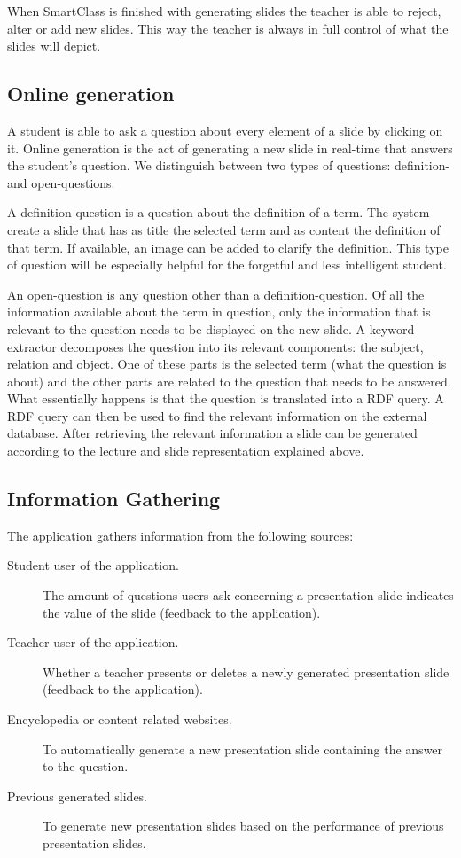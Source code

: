 \documentclass[11pt]{article}
\begin{document}
When SmartClass is finished with generating slides the teacher is able to reject, alter or add new slides. This way the teacher is always in full control of what the slides will depict. 

\subsection{Online generation}
A student is able to ask a question about every element of a slide by clicking on it. Online generation is the act of generating a new slide in real-time that answers the student’s question. We distinguish between two types of questions: definition- and open-questions. 

A definition-question is a question about the definition of a term. The system create a slide that has as title the selected term and as content the definition of that term. If available, an image can be added to clarify the definition. This type of question will be especially helpful for the forgetful and less intelligent student. 

An open-question is any question other than a definition-question. Of all the information available about the term in question, only the information that is relevant to the question needs to be displayed on the new slide. A keyword-extractor decomposes the question into its relevant components: the subject, relation and object. One of these parts is the selected term (what the question is about) and the other parts are related to the question that needs to be answered. What essentially happens is that the question is translated into a RDF query. A RDF query can then be used to find the relevant information on the external database. After retrieving the relevant information a slide can be generated according to the lecture and slide representation explained above.

\subsection{Information Gathering}
The application gathers information from the following sources:
\begin{description}
\item[Student user of the application.] The amount of questions users ask concerning a presentation slide indicates the value of the slide (feedback to the application).
\item[Teacher user of the application.] Whether a teacher presents or deletes a newly generated presentation slide (feedback to the application).
\item[Encyclopedia or content related websites.] To automatically generate a new presentation slide containing the answer to the question.
\item[Previous generated slides.] To generate new presentation slides based on the performance of previous presentation slides.
\end{description}
\end{document}
